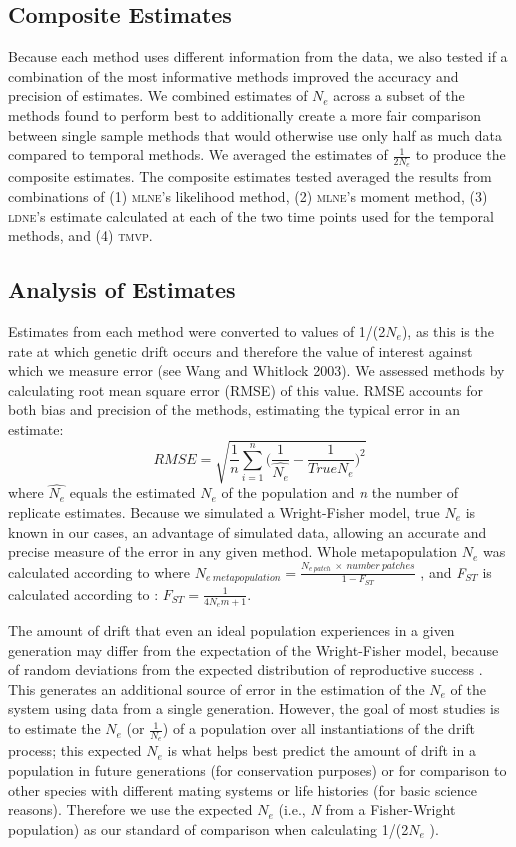 \subsection{Composite Estimates}
Because each method uses different information from the data, we also tested if a combination of 
the most informative methods improved the accuracy and precision of estimates. We combined
estimates of $N_e$ across a subset of the methods found to perform best to additionally 
create a more fair comparison between single sample methods that would otherwise use only half as 
much data compared to temporal methods. We averaged the estimates of $\frac{1}{2 N_e}$ to produce 
the composite estimates. The composite estimates tested averaged the results from combinations of 
(1) \textsc{mlne}'s likelihood method, (2) \textsc{mlne}'s moment method, (3) \textsc{ldne}'s 
estimate calculated at each of the two time points used for the temporal methods, and (4) \textsc{tmvp}.

\subsection{Analysis of Estimates}
Estimates from each method were converted to values of 1/(2$N_e$), as this is the rate at 
which genetic drift occurs and therefore the value of interest against which we measure error 
(see Wang and Whitlock 2003). We assessed methods by calculating root mean square error (RMSE) 
of this value. RMSE accounts for both bias and precision of the methods, estimating the typical 
error in an estimate:
\begin{equation}
RMSE = \sqrt{ \frac{1}{n} \displaystyle\sum_{i=1}^{n} \Big( \frac{1}{\hat{N_e}} - \frac{1}{True N_e} \Big)^2}
\end{equation}
where $\hat{N_e}$ equals the estimated $N_e$ of the population and \emph{n} the
number of replicate estimates. Because we simulated a Wright-Fisher model, true $N_e$ 
is known in our cases, an advantage of simulated data, allowing an accurate and precise measure of
the error in any given method. Whole metapopulation $N_e$ was
calculated according to \citet{Wright:1943} where 
$N_{e ~ metapopulation} = \frac{N_{e ~ patch} ~ \times ~ number ~ patches}{1 - F_{ST}}$
, and \emph{F}$_{ST}$ is calculated according to \citet{Wright:1931}: 
$F_{ST} = \frac{1}{4N_em + 1}$.

The amount of drift that even an ideal population experiences in a given generation may 
differ from the expectation of the Wright-Fisher model, because of random deviations from 
the expected distribution of reproductive success \citep{Waples:2009}. This generates 
an additional source of error in the estimation of the $N_e$ of the system using 
data from a single generation. However, the goal of most studies is to estimate the $N_e$ 
(or $\frac{1}{N_e}$) of a population over all instantiations of the drift process; this expected 
$N_e$ is what helps best predict the amount of drift in a population in future generations 
(for conservation purposes) or for comparison to other species with different mating systems or 
life histories (for basic science reasons). Therefore we use the expected $N_e$ 
(i.e., \emph{N} from a Fisher-Wright population) as our standard of comparison when calculating 1/(2$N_e$ ).

